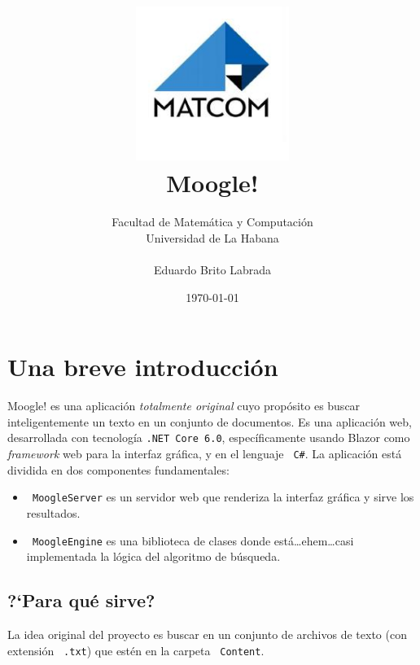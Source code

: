 \documentclass[a4paper, 12pt]{report}
\begin{document}
\title{
  \includegraphics[height=5cm]{images/matcom.jpg}  \\
	{\bf \LARGE Moogle!}}
\author{Facultad de Matem\'atica y Computaci\'on \\ Universidad de La Habana \\ \\ Eduardo Brito Labrada}
\date{\today}

\maketitle

\section*{Una breve introducci\'on}

Moogle! es una aplicación {\it totalmente original} cuyo propósito es buscar
inteligentemente un texto en un conjunto de documentos. Es una aplicación web,
desarrollada con tecnología {\tt \color{gray45}.NET Core 6.0}, específicamente
usando Blazor como {\it framework} web para la interfaz gráfica, y en el
lenguaje {\tt \color{gray45} C\#}. La aplicación está dividida en dos
componentes fundamentales:

\begin{itemize}
	\item {\tt \color{gray45} MoogleServer} es un servidor web que renderiza la interfaz gráfica y sirve los resultados.
	\item {\tt \color{gray45} MoogleEngine} es una biblioteca de clases donde está\dots ehem\dots casi implementada la lógica del algoritmo de búsqueda.
\end{itemize}

\subsection*{?`Para qu\'e sirve?}

La idea original del proyecto es buscar en un conjunto de archivos de texto
(con extensión {\tt \color{gray45} .txt}) que estén en la carpeta {\tt
		\color{gray45}Content}.
\end{document}
